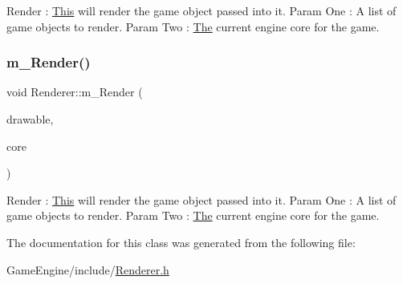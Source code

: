 Render \+: \mbox{\hyperlink{class_this}{This}} will render the game object passed into it. Param One \+: A list of game objects to render. Param Two \+: \mbox{\hyperlink{class_the}{The}} current engine core for the game. \mbox{\label{class_renderer_a2f7d175aafc8170e9082ea39abae1628}} 
\subsubsection{\texorpdfstring{m\+\_\+\+Render()}{m\_Render()}\hspace{0.1cm}{\footnotesize\ttfamily [3/3]}}
{\footnotesize\ttfamily void Renderer\+::m\+\_\+\+Render (\begin{DoxyParamCaption}\item[{std\+::vector$<$ \mbox{\hyperlink{class_game_object}{Game\+Object}} $\ast$$>$}]{drawable,  }\item[{\mbox{\hyperlink{class_i_engine_core}{I\+Engine\+Core}} $\ast$}]{core }\end{DoxyParamCaption})}

Render \+: \mbox{\hyperlink{class_this}{This}} will render the game object passed into it. Param One \+: A list of game objects to render. Param Two \+: \mbox{\hyperlink{class_the}{The}} current engine core for the game. 

The documentation for this class was generated from the following file\+:\begin{DoxyCompactItemize}
\item 
Game\+Engine/include/\mbox{\hyperlink{_renderer_8h}{Renderer.\+h}}\end{DoxyCompactItemize}
